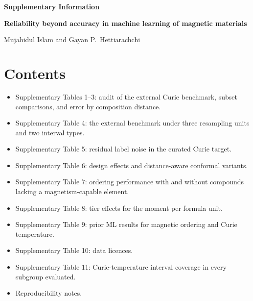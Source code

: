 \documentclass[11pt,a4paper]{article}
\begin{document}
\pagestyle{plain}

\begin{flushleft}
{\sffamily\bfseries\fontsize{17}{21}\selectfont Supplementary Information\par}
\vspace{6pt}
{\sffamily\bfseries\large Reliability beyond accuracy in machine learning of magnetic materials\par}
\vspace{8pt}
{\sffamily Mujahidul Islam and Gayan P.~Hettiarachchi\par}
\end{flushleft}

\section*{Contents}
\begin{itemize}
\item Supplementary Tables 1--3: audit of the external Curie benchmark, subset comparisons, and error by composition distance.
\item Supplementary Table 4: the external benchmark under three resampling units and two interval types.
\item Supplementary Table 5: residual label noise in the curated Curie target.
\item Supplementary Table 6: design effects and distance-aware conformal variants.
\item Supplementary Table 7: ordering performance with and without compounds lacking a magnetism-capable element.
\item Supplementary Table 8: tier effects for the moment per formula unit.
\item Supplementary Table 9: prior ML results for magnetic ordering and Curie temperature.
\item Supplementary Table 10: data licences.
\item Supplementary Table 11: Curie-temperature interval coverage in every subgroup evaluated.
\item Reproducibility notes.
\end{itemize}









\end{document}
